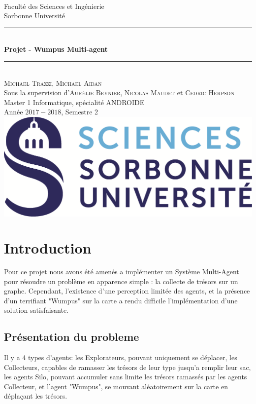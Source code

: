 \documentclass[a4paper, 10pt]{article}
\newcommand{\HRule}{\rule{\linewidth}{0.5mm}}
\begin{document}
\begin{titlepage}
\begin{center}
~\\[1cm]
\Large Faculté des Sciences et Ingénierie\\Sorbonne Université\\[3.5cm]
\HRule 
\\[0.4cm]{\huge \bfseries Projet - Wumpus Multi-agent\\[0.4cm]}
\HRule \\[1cm] 
\Large \textsc{Michaël Trazzi, Michaël Aidan} \\[0.1cm]
\normalsize Sous la supervision d'\textsc{Aurélie Beynier, Nicolas Maudet} et \textsc{Cedric Herpson}\\[2cm]
\Large Master 1 Informatique, spécialité ANDROIDE\\Année $2017-2018$, Semestre 2 \\[4cm]
\includegraphics[scale=0.3]{logo.png}
\end{center}
\end{titlepage}

\tableofcontents

\newpage
\section{Introduction}

Pour ce projet nous avons été amenés a implémenter un Système Multi-Agent pour résoudre un problème en apparence simple : la collecte de trésors sur un graphe. Cependant, l'existence d'une perception limitée des agents, et la présence d'un terrifiant "Wumpus" sur la carte a rendu difficile l'implémentation d'une solution satisfaisante.

\subsection{Présentation du probleme}

Il y a 4 types d'agents: les Explorateurs, pouvant uniquement se déplacer, les Collecteurs, capables de ramasser les trésors de leur type jusqu'a remplir leur sac, les agents Silo, pouvant accumuler sans limite les trésors ramassés par les agents Collecteur, et l'agent "Wumpus", se mouvant aléatoirement sur la carte en déplaçant les trésors.
\end{document}
